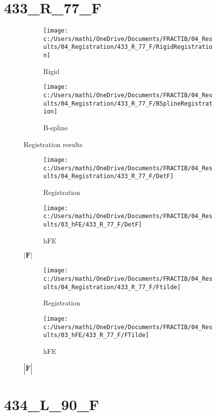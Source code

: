 \documentclass{article}%
\begin{document}
\section*{433\_R\_77\_F}%
\label{sec:433R77F}%


\begin{figure}[h!]%
\begin{subfigure}[b]{0.5\linewidth}%
\texttt{[image: c:/Users/mathi/OneDrive/Documents/FRACTIB/04\_Results/04\_Registration/433\_R\_77\_F/RigidRegistration]}%
\caption{Rigid}%
\end{subfigure}%
\begin{subfigure}[b]{0.5\linewidth}%
\texttt{[image: c:/Users/mathi/OneDrive/Documents/FRACTIB/04\_Results/04\_Registration/433\_R\_77\_F/BSplineRegistration]}%
\caption{B{-}spline}%
\end{subfigure}%
\caption{Registration results}%
\end{figure}

%


\begin{figure}[h!]%
\begin{subfigure}[b]{0.5\linewidth}%
\texttt{[image: c:/Users/mathi/OneDrive/Documents/FRACTIB/04\_Results/04\_Registration/433\_R\_77\_F/DetF]}%
\caption{Registration}%
\end{subfigure}%
\begin{subfigure}[b]{0.5\linewidth}%
\texttt{[image: c:/Users/mathi/OneDrive/Documents/FRACTIB/04\_Results/03\_hFE/433\_R\_77\_F/DetF]}%
\caption{hFE}%
\end{subfigure}%
\caption{$|\mathbf{F}|$}%
\end{figure}

%


\begin{figure}[h!]%
\begin{subfigure}[b]{0.5\linewidth}%
\texttt{[image: c:/Users/mathi/OneDrive/Documents/FRACTIB/04\_Results/04\_Registration/433\_R\_77\_F/Ftilde]}%
\caption{Registration}%
\end{subfigure}%
\begin{subfigure}[b]{0.5\linewidth}%
\texttt{[image: c:/Users/mathi/OneDrive/Documents/FRACTIB/04\_Results/03\_hFE/433\_R\_77\_F/FTilde]}%
\caption{hFE}%
\end{subfigure}%
\caption{$|\widetilde{\mathbf{F}}|$}%
\end{figure}

%
\newpage%
\section*{434\_L\_90\_F}%
\label{sec:434L90F}%
\end{document}
